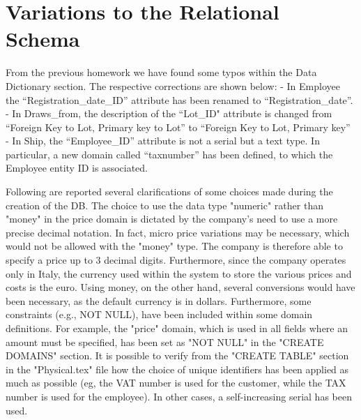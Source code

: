 \section{Variations to the Relational Schema}

From the previous homework we have found some typos within the Data Dictionary section. The respective corrections are shown below:
- In Employee the ``Registration\_date\_ID'' attribute has been renamed to ``Registration\_date''.
- In Draws\_from, the description of the ``Lot\_ID" attribute is changed from ``Foreign Key to Lot, Primary key to Lot'' to ``Foreign Key to Lot, Primary key''
- In Ship, the ``Employee\_ID'' attribute is not a serial but a text type. In particular, a new domain called ``taxnumber'' has been defined, to which the Employee entity ID is associated.

Following are reported several clarifications of some choices made during the creation of the DB. The choice to use the data type "numeric" rather than "money" in the price domain is dictated by the company's need to use a more precise decimal notation. In fact, micro price variations may be necessary, which would not be allowed with the "money" type. The company is therefore able to specify a price up to 3 decimal digits. Furthermore, since the company operates only in Italy, the currency used within the system to store the various prices and costs is the euro. Using money, on the other hand, several conversions would have been necessary, as the default currency is in dollars. Furthermore, some constraints (e.g., NOT NULL), have been included within some domain definitions. For example, the "price" domain, which is used in all fields where an amount must be specified, has been set as "NOT NULL" in the "CREATE DOMAINS" section. It is possible to verify from the "CREATE TABLE" section in the "Physical.tex" file how the choice of unique identifiers has been applied as much as possible (eg, the VAT number is used for the customer, while the TAX number is used for the employee). In other cases, a self-increasing serial has been used.